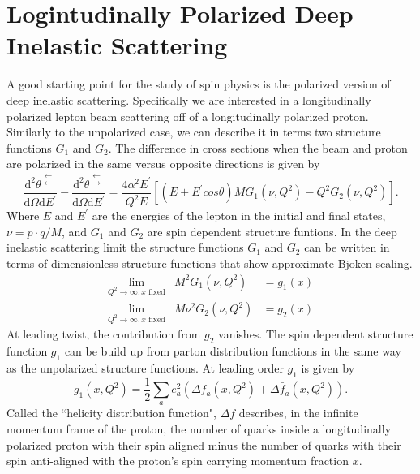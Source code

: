 \documentclass[abstract = on,listof=totoc, bibliography=totoc]{scrreprt}
\begin{document}
\section{Logintudinally Polarized Deep Inelastic Scattering}
A good starting point for the study of spin physics is the polarized version of deep inelastic scattering. Specifically we are interested in a longitudinally polarized lepton beam scattering off of a longitudinally polarized proton. Similarly to the unpolarized case, we can describe it in terms two structure functions $G_1$ and $G_2$. The difference in cross sections when the beam and proton are polarized in the same versus opposite directions is given by
\begin{equation}
\frac{\text{d}^2 \theta^{\substack{\leftarrow \\ \leftarrow}}}{\text{d} \Omega \text{d}E^{'}} - \frac{\text{d}^2\theta^{\substack{\leftarrow \\ \rightarrow}}}{\text{d}\Omega\text{d}E^{'}} = \frac{4\alpha^2E^'}{Q^2E}\left[(E+E^{'}cos\theta)MG_1(\nu,Q^2) - Q^2G_2(\nu,Q^2)\right].
\end{equation}
Where $E$ and $E^'$ are the energies of the lepton in the initial and final states, $\nu = p\cdot q/M$, and $G_1$ and $G_2$ are spin dependent structure funtions. In the deep inelastic scattering limit the structure functions $G_1$ and $G_2$ can be written in terms of  dimensionless structure functions that show approximate Bjoken scaling\cite{longReviewPaper}. 
\begin{eqnarray}
\lim\limits_{Q^2\rightarrow\infty, x \text{ fixed}}& M^2G_1(\nu,Q^2) &= g_1(x) \label{eq:g1}\\
\lim\limits_{Q^2\rightarrow\infty, x \text{ fixed}}& M\nu^2G_2(\nu,Q^2) &= g_2(x) \label{eq:g2}
\end{eqnarray}
At leading twist, the contribution from $g_2$ vanishes. The spin dependent structure function $g_1$ can be build up from parton distribution functions in the same way as the unpolarized structure functions. At leading order $g_1$ is given by
\begin{equation}
g_1(x,Q^2) = \frac{1}{2} \sum\limits_a e^2_a\left(\Delta f_a(x,Q^2) + \Delta \bar{f}_a(x,Q^2)\right).
\end{equation}
Called the ``helicity distribution function", $\Delta f$ describes, in the infinite momentum frame of the proton, the number of quarks inside a longitudinally polarized proton with their spin aligned minus the number of quarks with their spin anti-aligned with the proton's spin carrying momentum fraction $x$\cite{longReviewPaper}.
\end{document}
